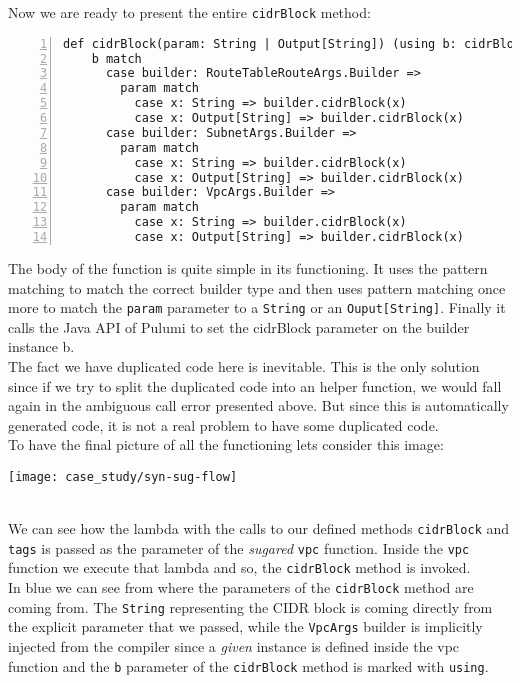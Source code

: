 Now we are ready to present the entire \texttt{cidrBlock} method:\\
\begin{minipage}{\linewidth}
\begin{lstlisting}[numbers=left, numberstyle=\tiny, numbersep=-5pt, stepnumber=1, linewidth=420pt]
  def cidrBlock(param: String | Output[String]) (using b: cidrBlockOwners): Unit =
    b match
      case builder: RouteTableRouteArgs.Builder =>
        param match
          case x: String => builder.cidrBlock(x)
          case x: Output[String] => builder.cidrBlock(x)
      case builder: SubnetArgs.Builder =>
        param match
          case x: String => builder.cidrBlock(x)
          case x: Output[String] => builder.cidrBlock(x)
      case builder: VpcArgs.Builder =>
        param match
          case x: String => builder.cidrBlock(x)
          case x: Output[String] => builder.cidrBlock(x)
\end{lstlisting}
\end{minipage}
The body of the function is quite simple in its functioning.
It uses the pattern matching to match the correct builder type and then uses pattern matching once more to match the \texttt{param} parameter to a \texttt{String} or an \texttt{Ouput[String]}.
Finally it calls the Java API of Pulumi to set the cidrBlock parameter on the builder instance b.\\
The fact we have duplicated code here is inevitable.
This is the only solution since if we try to split the duplicated code into an helper function, we would fall again in the ambiguous call error presented above.
But since this is automatically generated code, it is not a real problem to have some duplicated code.\\

To have the final picture of all the functioning lets consider this image:
\begin{center}
  \hspace*{-3cm}\texttt{[image: case\_study/syn-sug-flow]} 
\end{center}\mbox{}\\
We can see how the lambda with the calls to our defined methods \texttt{cidrBlock} and \texttt{tags} is passed as the  parameter of the \textit{sugared} \texttt{vpc} function.
Inside the \texttt{vpc} function we execute that lambda and so, the \texttt{cidrBlock} method is invoked.\\
In blue we can see from where the parameters of the \texttt{cidrBlock} method are coming from.
The \texttt{String} representing the CIDR block is coming directly from the explicit parameter that we passed,
while the \texttt{VpcArgs} builder is implicitly injected from the compiler since a \textit{given} instance is defined inside the vpc function and the \texttt{b} parameter of the \texttt{cidrBlock} method is marked with \texttt{using}.

